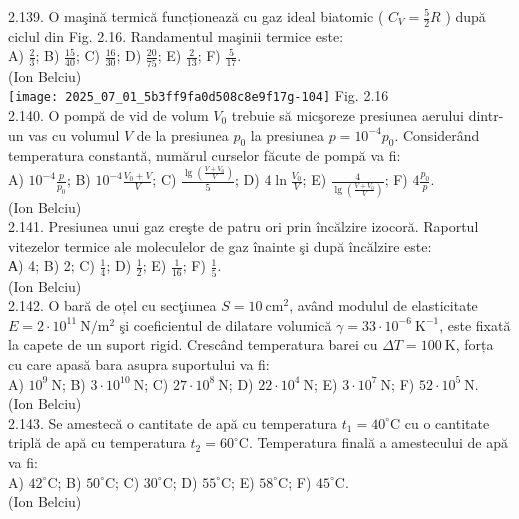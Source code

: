 2.139. O maşină termică funcționează cu gaz ideal biatomic ( $C_{V}=\frac{5}{2} R$ ) după ciclul din Fig. 2.16. Randamentul maşinii termice este:\\ A) $\frac{2}{3}$; B) $\frac{15}{40}$; C) $\frac{16}{30}$; D) $\frac{20}{75}$; E) $\frac{2}{13}$; F) $\frac{5}{17}$.\\ (Ion Belciu)\\ \texttt{[image: 2025\_07\_01\_5b3ff9fa0d508c8e9f17g-104]} Fig. 2.16\\

2.140. O pompă de vid de volum $V_{0}$ trebuie să micşoreze presiunea aerului dintr-un vas cu volumul $V$ de la presiunea $p_{0}$ la presiunea $p=10^{-4} p_{0}$. Considerând temperatura constantă, numărul curselor făcute de pompă va fi:\\ A) $10^{-4} \frac{p}{p_{0}}$; B) $10^{-4} \frac{V_{0}+V}{V}$; C) $\frac{\lg \left(\frac{V+V_{0}}{V}\right)}{5}$; D) $4 \ln \frac{V_{0}}{V}$; E) $\frac{4}{\lg \left(\frac{V+V_{0}}{V}\right)}$; F) $4 \frac{p_{0}}{p}$.\\ (Ion Belciu)\\

2.141. Presiunea unui gaz creşte de patru ori prin încălzire izocoră. Raportul vitezelor termice ale moleculelor de gaz înainte şi după încălzire este:\\ А) 4; B) 2; C) $\frac{1}{4}$; D) $\frac{1}{2}$; E) $\frac{1}{16}$; F) $\frac{1}{5}$.\\ (Ion Belciu)\\

2.142. O bară de oțel cu secţiunea $S=10 \mathrm{~cm}^{2}$, având modulul de elasticitate $E=2 \cdot 10^{11} \mathrm{~N} / \mathrm{m}^{2}$ şi coeficientul de dilatare volumică $\gamma=33 \cdot 10^{-6} \mathrm{~K}^{-1}$, este fixată la capete de un suport rigid. Crescând temperatura barei cu $\Delta T=100 \mathrm{~K}$, forța cu care apasă bara asupra suportului va fi:\\ A) $10^{9} \mathrm{~N}$; B) $3 \cdot 10^{10} \mathrm{~N}$; C) $27 \cdot 10^{8} \mathrm{~N}$; D) $22 \cdot 10^{4} \mathrm{~N}$; E) $3 \cdot 10^{7} \mathrm{~N}$; F) $52 \cdot 10^{5} \mathrm{~N}$.\\ (Ion Belciu)\\

2.143. Se amestecă o cantitate de apă cu temperatura $t_{1}=40^{\circ} \mathrm{C}$ cu o cantitate triplă de apă cu temperatura $t_{2}=60^{\circ} \mathrm{C}$. Temperatura finală a amestecului de apă va fi:\\ A) $42^{\circ} \mathrm{C}$; B) $50^{\circ} \mathrm{C}$; C) $30^{\circ} \mathrm{C}$; D) $55^{\circ} \mathrm{C}$; E) $58^{\circ} \mathrm{C}$; F) $45^{\circ} \mathrm{C}$.\\ (Ion Belciu)\\

